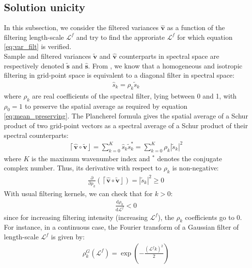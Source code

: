 \documentclass[12pt]{scrartcl}
\begin{document}
\subsection{Solution unicity}
In this subsection, we consider the filtered variances $\widehat{\mathbf{v}}$ as a function of the filtering length-scale $\mathcal{L}^f$ and try to find the approriate $\mathcal{L}^f$ for which equation \eqref{eq:var_filt} is verified.\\
$  $\\
Sample and filtered variances $\widetilde{\mathbf{v}}$ and $\widehat{\mathbf{v}}$ counterparts in spectral space are respectively denoted $\widetilde{\mathbf{s}}$ and $\widehat{\mathbf{s}}$. From \citet{berre_2000}, we know that a homogeneous and isotropic filtering in grid-point space is equivalent to a diagonal filter in spectral space:
\begin{align}
\widehat{s}_k = \rho_k \widetilde{s}_k
\end{align}
where $\rho_k$ are real coefficients of the spectral filter, lying between 0 and 1, with $\rho_0 = 1$ to preserve the spatial average as required by equation \eqref{eq:mean_preserving}. The Plancherel formula gives the spatial average of a Schur product of two grid-point vectors as a spectral average of a Schur product of their spectral counterparts:
\begin{align}
\left\lceil\widehat{\mathbf{v}} \circ \widetilde{\mathbf{v}}\right\rfloor = \sum_{k=0}^K \widehat{s}_k \widetilde{s}_k^*  = \sum_{k=0}^K \rho_k \left\vert \widetilde{s}_k \right\vert^2
\end{align}
where $K$ is the maximum wavenumber index and $^*$ denotes the conjugate complex number. Thus, its derivative with respect to $\rho_k$ is non-negative:
\begin{align}
\frac{\partial}{\partial \rho_k} \left(\left\lceil\widehat{\mathbf{v}} \circ \widetilde{\mathbf{v}}\right\rfloor\right) = \left\vert \widetilde{s}_k \right\vert^2 \ge 0 
\end{align}
$  $\\
With usual filtering kernels, we can check that for $k > 0$:
\begin{align}
\frac{\mathrm{d} \rho_k}{\mathrm{d} \mathcal{L}^f} < 0
\end{align}
since for increasing filtering intensity (increasing $\mathcal{L}^f$), the $\rho_k$ coefficients go to 0. For instance, in a continuous case, the Fourier transform of a Gaussian filter of length-scale $\mathcal{L}^f$ is given by:
\begin{align}
\rho^G_k \left(\mathcal{L}^f\right) = \exp\left(-\frac{\left(\mathcal{L}^f k\right)^2}{2}\right)
\end{align}
\end{document}
